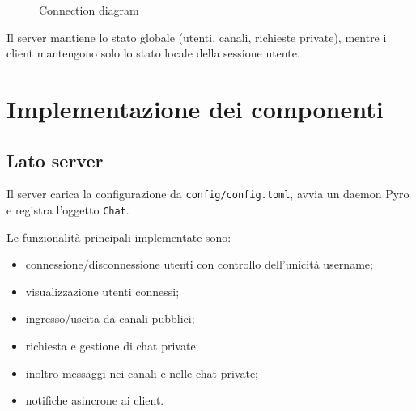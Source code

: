 \documentclass[11pt,a4paper]{article}
\begin{document}
\begin{figure}[h!]
    \centering
    \caption{Connection diagram}
    \label{fig:placeholder}
\end{figure}

Il server mantiene lo stato globale (utenti, canali, richieste private), mentre i client mantengono solo lo stato locale della sessione utente.

\section{Implementazione dei componenti}
\subsection{Lato server}
Il server carica la configurazione da \texttt{config/config.toml}, avvia un daemon Pyro e registra l'oggetto \texttt{Chat}.

\noindent Le funzionalità principali implementate sono:
\begin{itemize}
  \item connessione/disconnessione utenti con controllo dell'unicità username;
  \item visualizzazione utenti connessi;
  \item ingresso/uscita da canali pubblici;
  \item richiesta e gestione di chat private;
  \item inoltro messaggi nei canali e nelle chat private;
  \item notifiche asincrone ai client.
\end{itemize}
\end{document}
